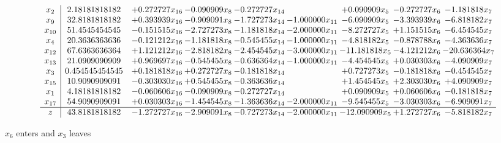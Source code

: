 \documentclass[10pt]{article}
\begin{document}
 \[\begin{array}{c| c c@{\hskip 2pt} c@{\hskip 2pt} c@{\hskip 2pt} c@{\hskip 2pt} c@{\hskip 2pt} c@{\hskip 2pt} c@{\hskip 2pt} }
 x_{2}   &  2.18181818182 & + 0.272727 x_{16} & -0.090909 x_{8} & -0.272727 x_{14} &   & + 0.090909 x_{5} & -0.272727 x_{6} & -1.181818 x_{7}\\
 x_{9}   &  32.8181818182 & + 0.393939 x_{16} & -0.909091 x_{8} & -1.727273 x_{14} & -1.000000 x_{11} & -6.090909 x_{5} & -3.393939 x_{6} & -6.818182 x_{7}\\
 x_{10}   &  51.4545454545 & -0.151515 x_{16} & -2.727273 x_{8} & -1.181818 x_{14} & -2.000000 x_{11} & -8.272727 x_{5} & + 1.151515 x_{6} & -6.454545 x_{7}\\
 x_{4}   &  20.3636363636 & -0.121212 x_{16} & -1.181818 x_{8} & -0.545455 x_{14} & -1.000000 x_{11} & -4.818182 x_{5} & -0.878788 x_{6} & -4.363636 x_{7}\\
 x_{12}   &  67.6363636364 & + 1.121212 x_{16} & -2.818182 x_{8} & -2.454545 x_{14} & -3.000000 x_{11} & -11.181818 x_{5} & -4.121212 x_{6} & -20.636364 x_{7}\\
 x_{13}   &  21.0909090909 & + 0.969697 x_{16} & -0.545455 x_{8} & -0.636364 x_{14} & -1.000000 x_{11} & -4.454545 x_{5} & + 0.030303 x_{6} & -4.090909 x_{7}\\
 x_{3}   &  0.454545454545 & + 0.181818 x_{16} & + 0.272727 x_{8} & -0.181818 x_{14} &   & + 0.727273 x_{5} & -0.181818 x_{6} & -0.454545 x_{7}\\
 x_{15}   &  10.9090909091 & -0.303030 x_{16} & + 0.545455 x_{8} & -0.363636 x_{14} &   & + 1.454545 x_{5} & + 2.303030 x_{6} & + 4.090909 x_{7}\\
 x_{1}   &  4.18181818182 & -0.060606 x_{16} & -0.090909 x_{8} & -0.272727 x_{14} &   & + 0.090909 x_{5} & + 0.060606 x_{6} & -0.181818 x_{7}\\
 x_{17}   &  54.9090909091 & + 0.030303 x_{16} & -1.454545 x_{8} & -1.363636 x_{14} & -2.000000 x_{11} & -9.545455 x_{5} & -3.030303 x_{6} & -6.909091 x_{7}\\
\hline
z    &  43.8181818182 & -1.272727 x_{16} & -2.909091 x_{8} & -0.727273 x_{14} & -2.000000 x_{11} & -12.090909 x_{5} & + 1.272727 x_{6} & -5.818182 x_{7}\\
\end{array}\]


 $ x_{6} $ enters and $ x_{3} $ leaves 
\end{document}

